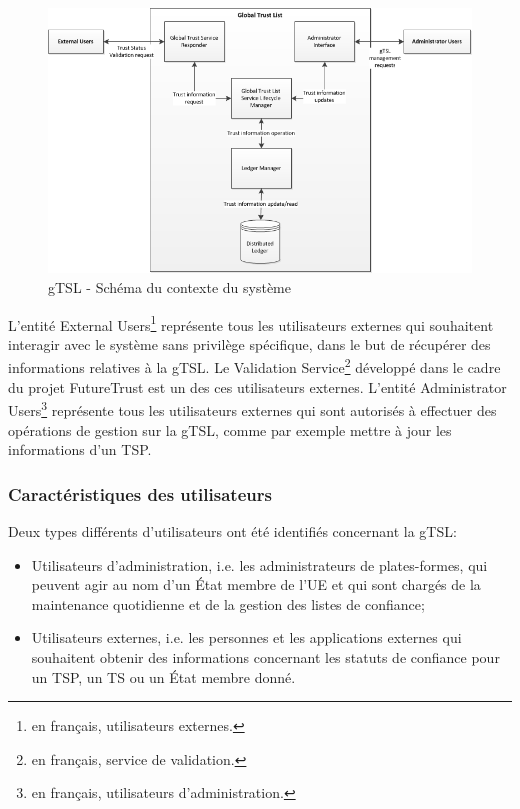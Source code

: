 \documentclass{tnreport}
\begin{document}
\begin{figure}[h]
	\centering
	\includegraphics[scale=0.8]{figures/gTSL-SystemContextDiagram}
	\caption{gTSL - Schéma du contexte du système \cite{design-document}}
	\label{fig:system-context-diagram}
\end{figure}

L'entité External Users\footnote{en français, utilisateurs externes.} représente tous les utilisateurs externes qui souhaitent interagir avec le système sans privilège spécifique, dans le but de récupérer des informations relatives à la gTSL. Le Validation Service\footnote{en français, service de validation.} développé dans le cadre du projet FutureTrust est un des ces utilisateurs externes.
L'entité Administrator Users\footnote{en français, utilisateurs d'administration.} représente tous les utilisateurs externes qui sont autorisés à effectuer des opérations de gestion sur la gTSL, comme par exemple mettre à jour les informations d'un TSP.

\subsubsection{Caractéristiques des utilisateurs}

Deux types différents d'utilisateurs ont été identifiés concernant la gTSL:
\begin{itemize}
	\item Utilisateurs d'administration, i.e. les administrateurs de plates-formes, qui peuvent agir au nom d'un État membre de l'UE et qui sont chargés de la maintenance quotidienne et de la gestion des listes de confiance;
	\item Utilisateurs externes, i.e. les personnes et les applications externes qui souhaitent obtenir des informations concernant les statuts de confiance pour un TSP, un TS ou un État membre donné.
\end{itemize}
\end{document}
